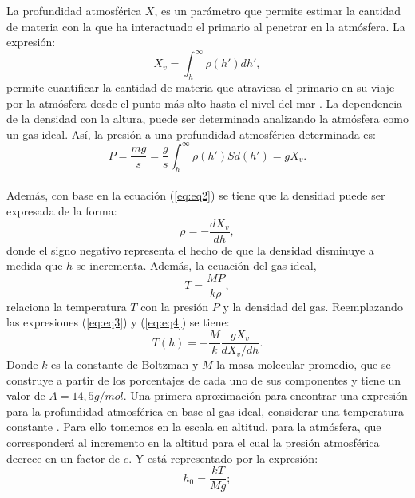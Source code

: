 La profundidad atmosférica $X$, es un parámetro que permite estimar la cantidad de materia con la que ha interactuado el primario al penetrar en la atmósfera. La expresión:
\begin{equation}
X_{v}= \int_{h}^{\infty} \rho (h') dh',
\label{eq:eq2}
\end{equation}
permite cuantificar la cantidad de materia que atraviesa el primario en su viaje por la atmósfera desde el punto más alto hasta el nivel del mar \parencite{mauro:oxigen}. La dependencia de la densidad con la altura, puede ser determinada analizando la atmósfera como un gas ideal. Así, la presión a una profundidad atmosférica determinada es:
\begin{equation}
P=\frac{mg}{s} = \frac{g}{s} \int^{\infty}_{h} \rho(h')S d(h') = gX_{v}.
\label{eq:eq3}
\end{equation}\\
Además, con base en la ecuación (\ref{eq:eq2}) se tiene que la densidad puede ser expresada de la forma:
\begin{equation}
\rho = -\frac{dX_{v}}{dh},
\label{eq:eq4}
\end{equation}
donde el signo negativo representa el hecho de que la densidad disminuye a medida que $h$ se incrementa. Además, la ecuación del gas ideal,
\begin{equation}
    T = \frac{MP}{k\rho},
    \label{eq:eq4c}
\end{equation}{}
relaciona la temperatura $T$ con la presión $P$ y la densidad del gas. Reemplazando las expresiones (\ref{eq:eq3}) y (\ref{eq:eq4}) se tiene:
\begin{equation}
    T(h) = -\frac{M}{k} \frac{gX_{v}}{dX_{v} /dh}.
    \label{eq:eq5}
\end{equation}{}
Donde $k$ es la constante de Boltzman y $M$ la masa molecular promedio, que se construye a partir de los porcentajes de cada uno de sus componentes y tiene un valor de $A= 14,5 g/mol$. Una primera aproximación para encontrar una expresión para la profundidad atmosférica en base al gas ideal, considerar una temperatura constante \parencite{mauro:oxigen}. Para ello tomemos en la escala en altitud, para la atmósfera, que corresponderá al incremento en la altitud para el cual la presión atmosférica decrece en un factor de $e$.  Y está representado por la expresión:
\begin{equation}
    h_{0}= \frac{kT}{Mg};
    \label{eq:eq6}
\end{equation}{}
